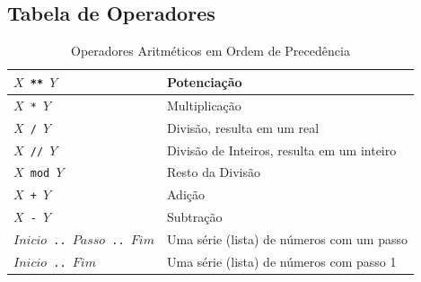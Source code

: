 \subsection{Tabela de Operadores} 
\begin{frame}[fragile]

\begin{small}
		
	\begin{table}
	\label{Operadores Aritméticos}
		\caption{Operadores Aritméticos em Ordem de Precedência}
		\begin{center}
			\begin{tabular}{ p{2cm}| p{5cm} } \hline
				\texttt{$X$ ** $Y$}  &   Potenciação \\ \hline 
				\texttt{$X$ * $Y$} &     Multiplicação \\ \hline 
				\texttt{$X$ / $Y$} &     Divisão, resulta em um real \\ \hline 
				\texttt{$X$ // $Y$} &    Divisão de Inteiros, resulta em um inteiro \\ \hline 
				\texttt{$X$ mod $Y$} &   Resto da Divisão\\ \hline
				\texttt{$X$ + $Y$} &     Adição \\ \hline 
				\texttt{$X$ - $Y$} &     Subtração \\ \hline 
				{\tt $Inicio$ \verb!..! $Passo$ \verb!..! $Fim$} & Uma série (lista) de números com um passo\\ 
				\hline 
				{\tt $Inicio$ \verb!..! $Fim$}  &   Uma série (lista) de números com passo 1 \\ \hline
			\end{tabular}
		\end{center}
	\end{table}

	\end{small}

\end{frame}


